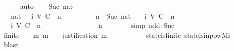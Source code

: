 \begin{isabellebody}
\ \ \ \ \isamarkupfalse%
\ auto\isanewline
{}\isamarkupfalse%
\isanewline
\ \ \isamarkupfalse%
\ {\isacharparenleft}Suc\ nat{\isacharparenright}\isanewline
\ \ \isamarkupfalse%
\ {\isachardoublequoteopen}{\isasymAnd}{\isasymsigma}\ {\isasymsigma}{\isacharprime}\ nat{\isachardot}\ {\isasymsigma}{\isacharprime}\ {\isasymin}\ {\isasymSigma}i\ {\isacharparenleft}V{\isacharcomma}\ C{\isacharcomma}\ {\isasymepsilon}{\isacharparenright}\ n\ {\isasymLongrightarrow}\ {\isasymsigma}\ {\isasymsubseteq}\ {\isasymsigma}{\isacharprime}\ {\isasymLongrightarrow}\ {\isasymsigma}\ {\isasymin}\ {\isasymSigma}\ {\isasymLongrightarrow}\ n\ {\isacharequal}\ Suc\ nat\ {\isasymLongrightarrow}\ {\isasymsigma}\ {\isasymin}\ {\isasymSigma}i\ {\isacharparenleft}V{\isacharcomma}\ C{\isacharcomma}\ {\isasymepsilon}{\isacharparenright}\ n{\isachardoublequoteclose}\isanewline
\ \ \isamarkupfalse%
\ {\isacharminus}\isanewline
\ \ \isamarkupfalse%
\ {\isasymsigma}\ {\isasymsigma}{\isacharprime}\isanewline
\ \ \isamarkupfalse%
\ {\isachardoublequoteopen}{\isasymsigma}{\isacharprime}\ {\isasymin}\ {\isasymSigma}i\ {\isacharparenleft}V{\isacharcomma}\ C{\isacharcomma}\ {\isasymepsilon}{\isacharparenright}\ n{\isachardoublequoteclose}\isanewline
\ \ \ {\isachardoublequoteopen}{\isasymsigma}\ {\isasymsubseteq}\ {\isasymsigma}{\isacharprime}{\isachardoublequoteclose}\ \isanewline
\ \ \ {\isachardoublequoteopen}{\isasymsigma}\ {\isasymin}\ {\isasymSigma}{\isachardoublequoteclose}\isanewline
\ \ \isamarkupfalse%
\ {\isachardoublequoteopen}n\ {\isachargreater}\ {}{\isachardoublequoteclose}\isanewline
\ \ \ \ \isamarkupfalse%
\ {\isacharparenleft}simp\ add{\isacharcolon}\ Suc{\isacharparenright}\isanewline
\ \ \isamarkupfalse%
\ {\isachardoublequoteopen}finite\ {\isasymsigma}\ {\isasymand}\ {\isacharparenleft}{\isasymforall}\ m{\isachardot}\ m\ {\isasymin}\ {\isasymsigma}\ {\isasymlongrightarrow}\ justification\ m\ {\isasymsubseteq}\ {\isasymsigma}{\isacharparenright}{\isachardoublequoteclose}\isanewline
\ \ \ \ \isamarkupfalse%
\ {\isacartoucheopen}{\isasymsigma}\ {\isasymin}\ {\isasymSigma}{\isacartoucheclose}\ state{\isacharunderscore}is{\isacharunderscore}finite\ state{\isacharunderscore}is{\isacharunderscore}in{\isacharunderscore}pow{\isacharunderscore}Mi\ \isamarkupfalse%
\ blast\isanewline
\ \ \isamarkupfalse%
\ \isamarkupfalse%

\end{isabellebody}
